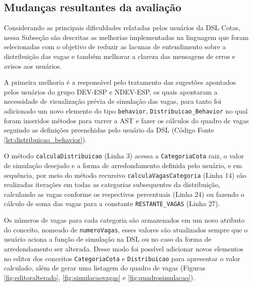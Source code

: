 \subsection{Mudanças resultantes da avaliação}
\label{sec:mudanasresultantes}

Considerando as principais dificuldades relatadas pelos usuários da DSL Cotas, nessa Subseção são descritas as melhorias implementadas na linguagem que foram selecionadas com o objetivo de reduzir as lacunas de entendimento sobre a distribuição das vagas e também melhorar a clareza das mensagens de erros e avisos aos usuários.

A primeira melhoria é a responsável pelo tratamento das sugestões apontados pelos usuários do grupo DEV-ESP e NDEV-ESP, os quais apontaram a necessidade de visualização prévia de simulação das vagas, para tanto foi adicionado um novo elemento do tipo \texttt{behavior}, \texttt{Distribuicao\_Behavior} no qual foram inseridos métodos para varrer a \gls{AST} e fazer os cálculos do quadro de vagas seguindo as definições preenchidas pelo usuário da DSL (Código Fonte \ref{lst:distribuicao_behavior}).

\newpage




O método \texttt{calculaDistribuicao} (Linha 3) acessa a \texttt{CategoriaCota} raiz, o valor de simulação desejado e a forma de arredondamento definida pelo usuário, e em sequência, por meio do método recursivo \texttt{calculaVagasCategoria} (Linha 14) são realizadas iterações em todas as categorias subsequentes da distribuição, calculando as vagas conforme os respectivos percentuais (Linha 24) ou fazendo o cálculo de soma das vagas para a constante \texttt{RESTANTE\_VAGAS} (Linha 27). 

Os números de vagas para cada categoria são armazenados em um novo atributo do conceito, nomeado de \texttt{numeroVagas}, esses valores são atualizados sempre que o usuário aciona a função de simulação na DSL ou no caso da forma de arredondamento ser alterada. Desse modo foi possível adicionar novos elementos no editor dos conceitos \texttt{CategoriaCota} e \texttt{Distribuicao} para apresentar o valor calculado, além de gerar uma listagem do quadro de vagas (Figuras \ref{fig:editoralterado}, \ref{fig:simulacaovagas} e \ref{fig:quadrosimulacao}).




